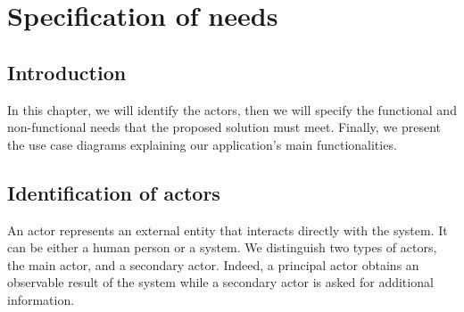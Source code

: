 \chapter{Specification of needs}
\section*{Introduction}
In this chapter, we will identify the actors, then we will specify the functional and non-functional needs that the proposed solution must meet. Finally, we present the use case diagrams explaining our application's main functionalities.
\section{Identification of actors}
An actor represents an external entity that interacts directly with the
system. It can be either a human person or a system. We distinguish
two types of actors, the main actor, and a secondary actor. Indeed,
a principal actor obtains an observable result of the system while a
secondary actor is asked for additional information.\\
